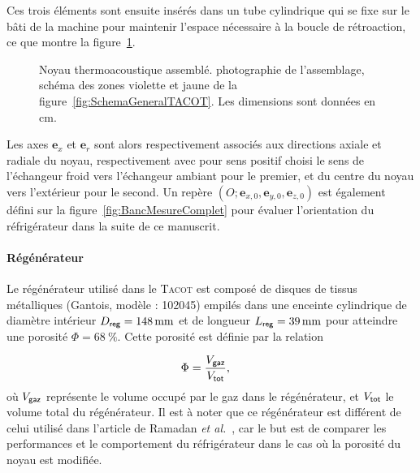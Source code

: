 Ces trois éléments sont ensuite insérés dans un tube cylindrique qui se fixe sur le bâti de la machine pour maintenir l'espace nécessaire à la boucle de rétroaction, ce que montre la figure~\ref{fig:PhotoNoyau}.

\begin{figure}[!ht]
    \centering
	\begin{subfigure}[c]{.49\textwidth}
		\centering
		\caption{}
		\label{fig:PhotoNoyau}
	\end{subfigure}		
	\begin{subfigure}[c]{.49\textwidth}
		\centering
		
		\caption{}
		\label{fig:SchemaNoyau}
	\end{subfigure}	    
    \caption{Noyau thermoacoustique assemblé.  photographie de l'assemblage,  schéma des zones violette et jaune de la figure~\ref{fig:SchemaGeneralTACOT}. Les dimensions sont données en \unit{\centi\meter}.}
    \label{fig:PhotoSchemaNoyau}
\end{figure}


Les axes $\mathbf e_x$ et $\mathbf e_r$ sont alors respectivement associés aux directions axiale et radiale du noyau, respectivement avec pour sens positif choisi le sens de l'échangeur froid vers l'échangeur ambiant pour le premier, et du centre du noyau vers l'extérieur pour le second. Un repère $(O;\mathbf e_{x,0},\mathbf e_{y,0},\mathbf e_{z,0})$ est également défini sur la figure~\ref{fig:BancMesureComplet} pour évaluer l'orientation du réfrigérateur dans la suite de ce manuscrit.\medskip

\paragraph{Régénérateur} Le régénérateur utilisé dans le \textsc{Tacot} est composé de  disques de tissus métalliques (Gantois, modèle : 102045) empilés dans une enceinte cylindrique de diamètre intérieur $D_{\sf reg}=\qty{148}{\mm}$ et de longueur $L_{\sf reg}=\qty{39}{\mm}$ pour atteindre une porosité $\Phi=\qty{68}{\percent}$. Cette porosité est définie par la relation

\begin{align}
	\Phi &= \frac{V_{\sf gaz}}{V_{\sf tot}}, \label{eq:Porosite_Volume}%
\end{align}
où $V_{\sf gaz}$ représente le volume occupé par le gaz dans le régénérateur, et $V_{\sf tot}$ le volume total du régénérateur. Il est à noter que ce régénérateur est différent de celui utilisé dans l'article de Ramadan \textit{et al.}~\cite{ramadan_design_2021}, car le but est de comparer les performances et le comportement du réfrigérateur dans le cas où la porosité du noyau est modifiée. 

